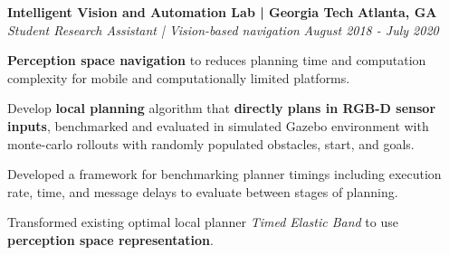 \headerrow
    {\textbf{Intelligent Vision and Automation Lab | Georgia Tech}}
    {\textbf{Atlanta, GA}}
\\
\headerrow
    {\emph{Student Research Assistant | Vision-based navigation}}
    {\emph{August 2018 - July 2020}}

\begin{itemize*}
    \item \textbf{Perception space navigation} to reduces planning time and computation complexity for mobile and computationally limited platforms. 
    \item Develop \textbf{local planning} algorithm that \textbf{directly plans in RGB-D sensor inputs},
        benchmarked and evaluated in simulated Gazebo environment with
        monte-carlo rollouts  with randomly populated obstacles, start, and goals.
    \item Developed a framework for benchmarking planner timings including execution rate, time, and message delays to evaluate
        between stages of planning.
    \item Transformed existing optimal local planner \emph{Timed Elastic Band} to use \textbf{perception space representation}.   
\end{itemize*}